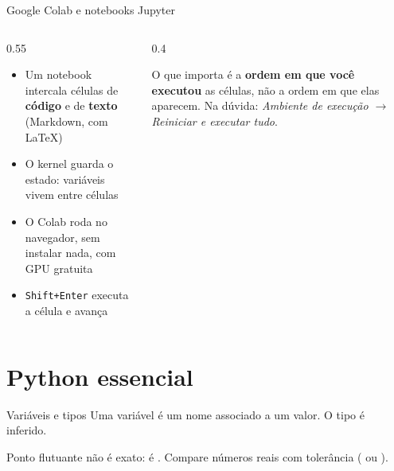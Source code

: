\documentclass[aspectratio=169,11pt]{beamer}
\begin{document}
\begin{frame}{Google Colab e notebooks Jupyter}
  \begin{columns}[c]
    \begin{column}{0.55\textwidth}
      \begin{itemize}
        \item Um \alert{notebook} intercala células de \textbf{código} e de
              \textbf{texto} (Markdown, com \LaTeX)
        \item O \alert{kernel} guarda o estado: variáveis vivem entre células
        \item O Colab roda no navegador, sem instalar nada, com GPU gratuita
        \item \texttt{Shift+Enter} executa a célula e avança
      \end{itemize}
    \end{column}
    \begin{column}{0.4\textwidth}
      \begin{atencao}
        \small O que importa é a \textbf{ordem em que você executou} as células,
        não a ordem em que elas aparecem. Na dúvida:
        \emph{Ambiente de execução $\to$ Reiniciar e executar tudo}.
      \end{atencao}
    \end{column}
  \end{columns}
\end{frame}

\section{Python essencial}

\begin{frame}[fragile]{Variáveis e tipos}
  Uma variável é um \alert{nome} associado a um \alert{valor}. O tipo é inferido.
  \begin{atencao}
    \small Ponto flutuante não é exato:  é .
    Compare números reais com tolerância ( ou ).
  \end{atencao}
\end{frame}
\end{document}
